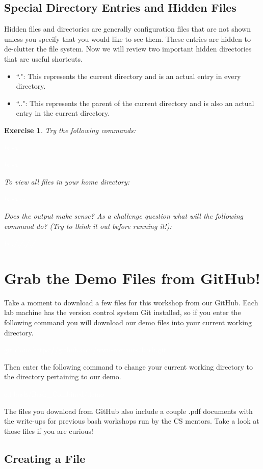 \documentclass[oneside]{book}
\newcommand{\commandline}[1]{\begin{center} \colorbox{Dark}{\textcolor{white}{#1}} \end{center}}
\newtheorem{ex}{Exercise}[chapter]
\begin{document}
\subsection{Special Directory Entries and Hidden Files}

Hidden files and directories are generally configuration files that are not shown unless you specify that you would like to see them. These entries are hidden to de-clutter the file system. Now we will review two important hidden directories that are useful shortcuts.

\begin{itemize}
	\item ``.": This represents the current directory and is an actual entry in every directory.
	\item ``..": This represents the parent of the current directory and is also an actual entry in the current directory.
\end{itemize}
\vspace{0.3cm}
\begin{ex}
	Try the following commands:
	\commandline{ls -a}
	\commandline{ls -a .}
To view all files in your home directory:
	\commandline{ls -a $\sim$}

Does the output make sense? As a challenge question what will the following command do? (Try to think it out before running it!):
	\commandline{ls ././././}
\end{ex}

\section{Grab the Demo Files from GitHub!}
Take a moment to download a few files for this workshop from our GitHub. Each lab machine has the version control system Git installed, so if you enter the following command you will download our demo files into your current working directory.

\commandline{git clone https://github.com/wwu-mentors/bash.git}
Then enter the following command to change your current working directory to the directory pertaining to our demo.
\commandline{cd bash/Bash\_Combined/demo}
The files you download from GitHub also include a couple .pdf documents with the write-ups for previous bash workshops run by the CS mentors. Take a look at those files if you are curious!

\subsection{Creating a File}
\end{document}
